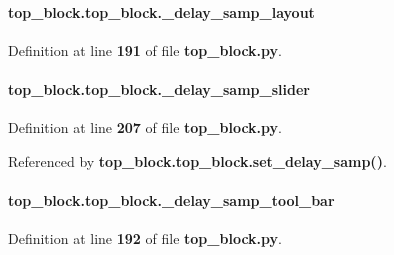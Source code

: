 \paragraph[{\+\_\+delay\+\_\+samp\+\_\+layout}]{\setlength{\rightskip}{0pt plus 5cm}top\+\_\+block.\+top\+\_\+block.\+\_\+delay\+\_\+samp\+\_\+layout\hspace{0.3cm}{\ttfamily [private]}}\label{classtop__block_1_1top__block_a5aae3063129b3312ef8fd4cc0b6566fd}


Definition at line {\bf 191} of file {\bf top\+\_\+block.\+py}.

\paragraph[{\+\_\+delay\+\_\+samp\+\_\+slider}]{\setlength{\rightskip}{0pt plus 5cm}top\+\_\+block.\+top\+\_\+block.\+\_\+delay\+\_\+samp\+\_\+slider\hspace{0.3cm}{\ttfamily [private]}}\label{classtop__block_1_1top__block_a59001425eccc7a15cbf647ddd9e753fe}


Definition at line {\bf 207} of file {\bf top\+\_\+block.\+py}.



Referenced by {\bf top\+\_\+block.\+top\+\_\+block.\+set\+\_\+delay\+\_\+samp()}.

\paragraph[{\+\_\+delay\+\_\+samp\+\_\+tool\+\_\+bar}]{\setlength{\rightskip}{0pt plus 5cm}top\+\_\+block.\+top\+\_\+block.\+\_\+delay\+\_\+samp\+\_\+tool\+\_\+bar\hspace{0.3cm}{\ttfamily [private]}}\label{classtop__block_1_1top__block_a64207dfc84dc3b4e64bd92a2b945b9cc}


Definition at line {\bf 192} of file {\bf top\+\_\+block.\+py}.

